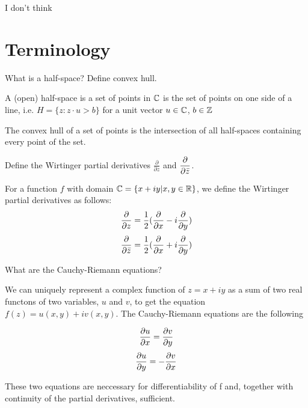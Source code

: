 \documentclass{homework}
\author{Alex Li}
\begin{document}
\maketitle

\begin{inspiration}
I don't think 
\end{inspiration}

\section{Terminology}

\begin{problem}
  What is a half-space?  Define convex hull.
\end{problem}
\begin{solution}
A (open) half-space is a set of points in $\mathbb{C}$ is the set of points on one side of a line, i.e. $H=\{z: z\cdot u > b\}$ for a unit vector $u\in\mathbb{C}$, $b\in\mathbb{Z}$
 
The convex hull of a set of points is the intersection of all half-spaces containing every point of the set.

\end{solution}
\begin{problem}
Define the Wirtinger partial derivatives $\displaystyle\frac{\partial}{\partial z}$ and $\displaystyle\frac{\partial}{\partial \bar{z}}$.
\end{problem}
\begin{solution}
For a function $f$ with domain $\mathbb{C} = \{x + iy|x, y\in\mathbb{R}\}$, we define the Wirtinger partial derivatives as follows:
\[\frac{\partial }{\partial z} = \frac{1}{2}(\frac{\partial }{\partial x} - i\frac{\partial }{\partial y})\]
\[\frac{\partial }{\partial \bar{z}} = \frac{1}{2}(\frac{\partial }{\partial x} + i\frac{\partial }{\partial y})\]
\end{solution}

\begin{problem}
  What are the Cauchy-Riemann equations?
\end{problem}
We can uniquely represent a complex function of $z = x + iy$ as a sum of two real functons of two variables, $u$ and $v$, to get the equation  $f(z) = u(x, y) + iv(x, y).$
The Cauchy-Riemann equations are the following
\begin{solution}
\[\frac{\partial u}{\partial x} = \frac{\partial v}{\partial y}\label{cauchy-riemann-x-real}\]
\[\frac{\partial u}{\partial y} = -\frac{\partial v}{\partial x}\label{cauchy-riemann-y-real}\]
\end{solution}
These two equations are neccessary for differentiability of f and, together with continuity of the partial derivatives, sufficient. 
\end{document}
